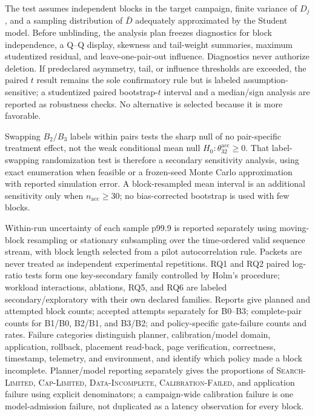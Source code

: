 The test assumes independent blocks in the target campaign, finite variance of $D_j$, and a sampling distribution of $\bar D$ adequately approximated by the Student model. Before unblinding, the analysis plan freezes diagnostics for block independence, a Q--Q display, skewness and tail-weight summaries, maximum studentized residual, and leave-one-pair-out influence. Diagnostics never authorize deletion. If predeclared asymmetry, tail, or influence thresholds are exceeded, the paired $t$ result remains the sole confirmatory rule but is labeled assumption-sensitive; a studentized paired bootstrap-$t$ interval and a median/sign analysis are reported as robustness checks. No alternative is selected because it is more favorable.

Swapping $B_2/B_3$ labels within pairs tests the sharp null of no pair-specific treatment effect, not the weak conditional mean null $H_0:\theta_{32}^{\mathrm{acc}}\geq0$. That label-swapping randomization test is therefore a secondary sensitivity analysis, using exact enumeration when feasible or a frozen-seed Monte Carlo approximation with reported simulation error. A block-resampled mean interval is an additional sensitivity only when $n_{\mathrm{acc}}\geq30$; no bias-corrected bootstrap is used with few blocks.

Within-run uncertainty of each sample p99.9 is reported separately using moving-block resampling or stationary subsampling over the time-ordered valid sequence stream, with block length selected from a pilot autocorrelation rule. Packets are never treated as independent experimental repetitions. RQ1 and RQ2 paired log-ratio tests form one key-secondary family controlled by Holm's procedure; workload interactions, ablations, RQ5, and RQ6 are labeled secondary/exploratory with their own declared families. Reports give planned and attempted block counts; accepted attempts separately for B0--B3; complete-pair counts for B1/B0, B2/B1, and B3/B2; and policy-specific gate-failure counts and rates. Failure categories distinguish planner, calibration/model domain, application, rollback, placement read-back, page verification, correctness, timestamp, telemetry, and environment, and identify which policy made a block incomplete. Planner/model reporting separately gives the proportions of \textsc{Search-Limited}, \textsc{Cap-Limited}, \textsc{Data-Incomplete}, \textsc{Calibration-Failed}, and application failure using explicit denominators; a campaign-wide calibration failure is one model-admission failure, not duplicated as a latency observation for every block.

